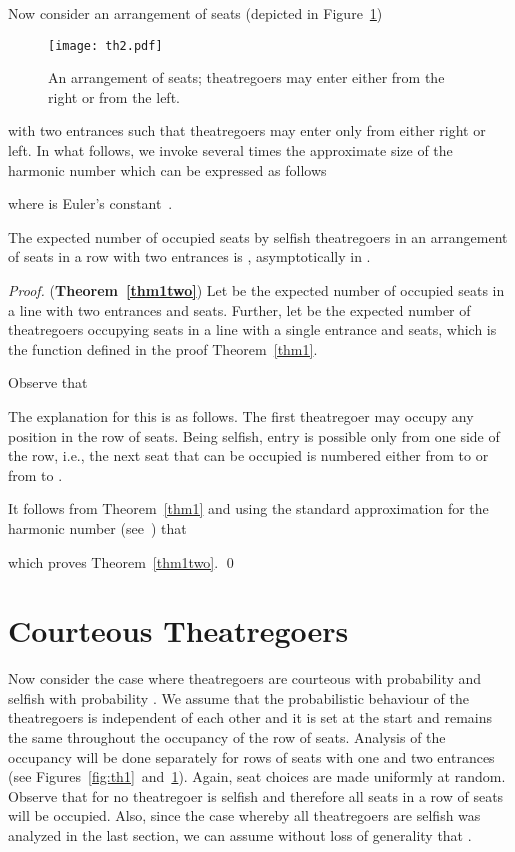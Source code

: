 \documentclass[11pt]{llncs}
\begin{document}
Now consider an arrangement of  seats
(depicted in Figure~\ref{fig:th2})
\begin{figure}[!htb]
\begin{center}
\texttt{[image: th2.pdf]}\end{center}
\caption{An arrangement of  seats; theatregoers may enter either from the right
or from the left.}
\label{fig:th2}
\end{figure}
with two entrances
such that 
theatregoers may enter only from either right or left.
In what follows, we invoke several times the approximate size of 
the harmonic number  which can be expressed as follows

where  is Euler's constant~\cite{knuth}.

\begin{theorem}
\label{thm1two}
The expected number of occupied seats by selfish theatregoers
in an arrangement of  seats
in a row with two entrances is , 
asymptotically in .
\end{theorem}





\begin{proof}({\bf Theorem~\ref{thm1two}})
Let  be the expected number of occupied seats
in a line with two entrances and  seats.
Further, let  be the expected number of theatregoers occupying seats 
in a line with a single entrance and  seats, which is
the function defined
in the proof Theorem~\ref{thm1}.

Observe that 

The explanation for this is as follows. 
The first theatregoer may occupy any position
 in the row of  seats.
Being selfish, entry is possible only 
from one side of the row, i.e., the next seat that
can be occupied is numbered either
from  to  or from  to .  

It follows from Theorem~\ref{thm1} and using the standard approximation
for the harmonic number (see~\cite{knuth}) that

which proves Theorem~\ref{thm1two}.
\qed
\end{proof}


\section{Courteous Theatregoers}
\label{courteous:sec}

Now consider the case where theatregoers are 
courteous with probability  and
selfish with
probability . 
We assume that the probabilistic behaviour of
the theatregoers is independent of each other and
it is set at the start and remains the same throughout
the occupancy of the row of seats. Analysis
of the occupancy will be done separately
for rows of seats with one and two entrances
(see Figures~\ref{fig:th1}~and~\ref{fig:th2}). Again, 
seat choices are made uniformly at random. 
Observe that
for  no theatregoer is selfish and therefore all
seats in a row of seats will be occupied.
Also, since
the case  whereby all theatregoers are selfish
was analyzed in the last section, we can assume without
loss of generality
that .
\end{document}
